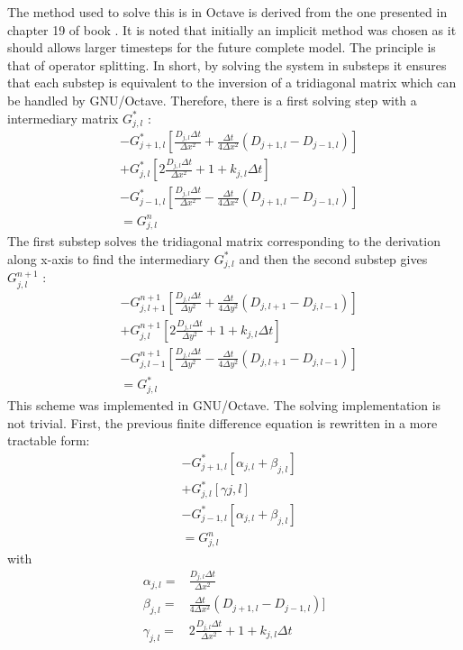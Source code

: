 \documentclass[11pt,a4paper]{article}
\begin{document}
The method used to solve this is in Octave is derived from the one presented in chapter 19 of book \cite{Press1992}. It is noted that initially an implicit method was chosen as it should allows larger timesteps for the future complete model. The principle is that of operator splitting. In short, by solving the system in substeps it ensures that each substep is equivalent to the inversion of a tridiagonal matrix which can be handled by GNU/Octave. Therefore, there is a first solving step with a intermediary  matrix $G^{*}_{j,l}$ : 
\begin{align*}
  &-G^{*}_{j+1,l}[ \frac{D_{j,l}\Delta t}{\Delta x^2} + \frac{\Delta t}{4 \Delta x^2}(D_{j+1,l} - D_{j-1,l})]  \\
&+ G^{*}_{j,l}[2 \frac{D_{j,l}\Delta t}{\Delta x^2} +1+k_{j,l}\Delta t]  \\
&- G^{*}_{j-1,l}[ \frac{D_{j,l}\Delta t}{\Delta x^2} - \frac{\Delta t}{4 \Delta x^2}(D_{j+1,l} - D_{j-1,l})]\\
 &= G^{n}_{j,l} 
\end{align*}
The first substep solves the tridiagonal matrix corresponding to the derivation along x-axis to find the intermediary $G^{*}_{j,l}$ and then the second substep gives $G^{n+1}_{j,l}$ :
\begin{align*}
  &-G^{n+1}_{j,l+1}[ \frac{D_{j,l}\Delta t}{\Delta y^2} + \frac{\Delta t}{4 \Delta y^2}(D_{j,l+1} - D_{j,l-1})]  \\
&+ G^{n+1}_{j,l}[2 \frac{D_{j,l}\Delta t}{\Delta y^2} +1 + k_{j,l}\Delta t]  \\
&- G^{n+1}_{j,l-1}[ \frac{D_{j,l}\Delta t}{\Delta y^2} - \frac{\Delta t}{4 \Delta y^2}(D_{j,l+1} - D_{j,l-1})]\\
 &= G^{*}_{j,l} 
\end{align*}
This scheme was implemented in GNU/Octave. The solving implementation is not trivial. First, the previous finite difference equation is rewritten in a more tractable form:
\begin{align*}
  &-G^{*}_{j+1,l}[ \alpha_{j,l} + \beta_{j,l}]  \\
&+ G^{*}_{j,l}[\gamma{j,l} ]  \\
&- G^{*}_{j-1,l}[  \alpha_{j,l} + \beta_{j,l}]\\
 &= G^{n}_{j,l} 
\end{align*}
with 
\begin{align*}
 \alpha_{j,l} =&  \frac{D_{j,l}\Delta t}{\Delta x^2} \\
\beta_{j,l} =& \frac{\Delta t}{4 \Delta x^2}(D_{j+1,l} - D_{j-1,l})]   \\
\gamma_{j,l} =&  2 \frac{D_{j,l}\Delta t}{\Delta x^2} +1 + k_{j,l}\Delta t
\end{align*}
\end{document}
